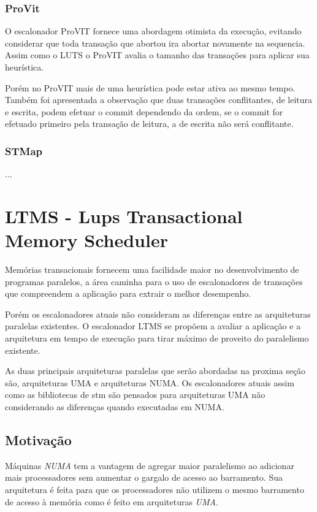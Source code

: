 \documentclass[diss,capa]{texufpel}
\begin{document}
\subsection{ProVit}

O escalonador ProVIT fornece uma abordagem otimista da execução, evitando considerar que toda transação que abortou ira abortar novamente na sequencia. Assim como o LUTS o ProVIT avalia o tamanho das transações para aplicar sua heurística.

Porém no ProVIT mais de uma heurística pode estar ativa ao mesmo tempo. Também foi apresentada a observação que duas transações conflitantes, de leitura e escrita, podem efetuar o commit dependendo da ordem, se o commit for efetuado primeiro pela transação de leitura, a de escrita não será conflitante.



\subsection{STMap}

...

\chapter{LTMS - Lups Transactional Memory Scheduler}
\label{chapter::ltms}

Memórias transacionais fornecem uma facilidade maior no desenvolvimento de programas paralelos, a área caminha para o uso de escalonadores de transações que compreendem a aplicação para extrair o melhor desempenho.

Porém os escalonadores atuais não consideram as diferenças entre as arquiteturas paralelas existentes. O escalonador LTMS se propõem a avaliar a aplicação e a arquitetura em tempo de execução para tirar máximo de proveito do paralelismo existente.

As duas principais arquiteturas paralelas que serão abordadas na proxima seção são, arquiteturas UMA e arquiteturas NUMA. Os escalonadores atuais assim como as bibliotecas de stm são pensados para arquiteturas UMA não considerando as diferenças quando executadas em NUMA.

\section{\textbf{Motivação}}

Máquinas \emph{NUMA} tem a vantagem de agregar maior paralelismo ao adicionar mais processadores sem aumentar o gargalo de acesso ao barramento. Sua arquitetura é feita para que os processadores não utilizem o mesmo barramento de acesso à memória como é feito em arquiteturas \emph{UMA}.
\end{document}
